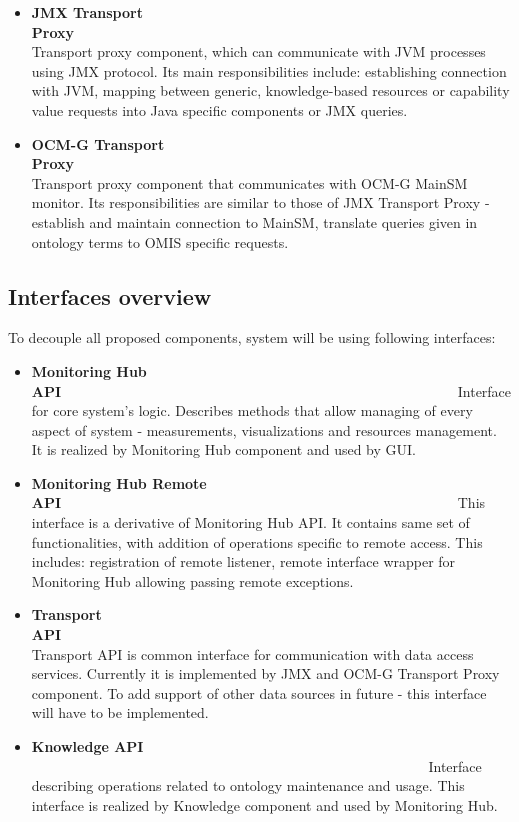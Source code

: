 \begin{itemize}
\item {\bf JMX Transport Proxy}~~~~~~~~~~~~~~~~~~~~~~~~~~~~~~~~~~~~~~~~~~~~~~~~~~~~~~~~\linebreak
Transport proxy component, which can communicate with JVM processes using JMX protocol. Its main responsibilities include: establishing connection with JVM, mapping between generic, knowledge-based resources or capability value requests into Java specific components or JMX queries.

\item {\bf OCM-G Transport Proxy}~~~~~~~~~~~~~~~~~~~~~~~~~~~~~~~~~~~~~~~~~~~~~~~~~~~~~~~~\linebreak
Transport proxy component that communicates with OCM-G MainSM monitor. Its responsibilities are similar to those of JMX Transport Proxy - establish and maintain connection to MainSM, translate queries given in ontology terms to OMIS specific requests.

\end{itemize}

\subsection{Interfaces overview}

To decouple all proposed components, system will be using following interfaces:

\begin{itemize}

\item {\bf Monitoring Hub API}~~~~~~~~~~~~~~~~~~~~~~~~~~~~~~~~~~~~~~~~~~~~~~~~~~~~~~~~\linebreak
Interface for core system's logic. Describes methods that allow managing of every aspect of system - measurements, visualizations and resources management. It is realized by Monitoring Hub component and used by GUI. 

\item {\bf Monitoring Hub Remote API}~~~~~~~~~~~~~~~~~~~~~~~~~~~~~~~~~~~~~~~~~~~~~~~~~~~~~~~~\linebreak
This interface is a derivative of Monitoring Hub API. It contains same set of functionalities, with addition of operations specific to remote access. This includes: registration of remote listener, remote interface wrapper for Monitoring Hub allowing passing remote exceptions.

\item {\bf Transport API}~~~~~~~~~~~~~~~~~~~~~~~~~~~~~~~~~~~~~~~~~~~~~~~~~~~~~~~~\linebreak
Transport API is common interface for communication with data access services. Currently it is implemented by JMX and OCM-G Transport Proxy component. To add support of other data sources in future - this interface will have to be implemented.

\item {\bf Knowledge API} ~~~~~~~~~~~~~~~~~~~~~~~~~~~~~~~~~~~~~~~~~~~~~~~~~~~~~~~~\linebreak
Interface describing operations related to ontology maintenance and usage. This interface is realized by Knowledge component and used by Monitoring Hub. 

\end{itemize}

